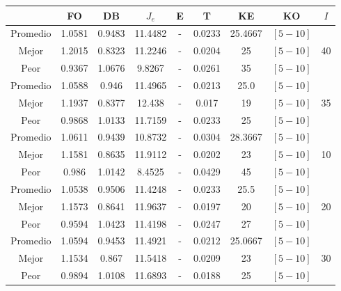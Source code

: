 \begin{table}[h!]
    \footnotesize
    \begin{center}
        \begin{tabular}{|c|c|c|c|c|c|c|c|c|}
        \hline
            & {\bf FO} & {\bf DB} & $J_e$ & {\bf E} & {\bf T} & {\bf KE} & {\bf KO} & $I$\\
        \hline
        \hline
            Promedio  & 1.0581 & 0.9483 & 11.4482 & - & 0.0233 & 25.4667 & $[5-10]$ & \\
            \cline{1-8}
            Mejor & 1.2015 & 0.8323  & 11.2246 & - & 0.0204 & 25 & $[5-10]$ & 40\\
            \cline{1-8}
            Peor & 0.9367 & 1.0676  & 9.8267 & - & 0.0261 & 35 & $[5-10]$ & \\
        \hline
        \hline
            Promedio  & 1.0588 & 0.946 & 11.4965 & - & 0.0213 & 25.0 & $[5-10]$ & \\
            \cline{1-8}
            Mejor & 1.1937 & 0.8377  & 12.438 & - & 0.017 & 19 & $[5-10]$ & 35\\
            \cline{1-8}
            Peor & 0.9868 & 1.0133  & 11.7159 & - & 0.0233 & 25 & $[5-10]$ & \\
        \hline
        \hline
            Promedio  & 1.0611 & 0.9439 & 10.8732 & - & 0.0304 & 28.3667 & $[5-10]$ & \\
            \cline{1-8}
            Mejor & 1.1581 & 0.8635  & 11.9112 & - & 0.0202 & 23 & $[5-10]$ & 10\\
            \cline{1-8}
            Peor & 0.986 & 1.0142  & 8.4525 & - & 0.0429 & 45 & $[5-10]$ & \\
        \hline
        \hline
            Promedio  & 1.0538 & 0.9506 & 11.4248 & - & 0.0233 & 25.5 & $[5-10]$ & \\
            \cline{1-8}
            Mejor & 1.1573 & 0.8641  & 11.9637 & - & 0.0197 & 20 & $[5-10]$ & 20\\
            \cline{1-8}
            Peor & 0.9594 & 1.0423  & 11.4198 & - & 0.0247 & 27 & $[5-10]$ & \\
        \hline
        \hline
            Promedio  & 1.0594 & 0.9453 & 11.4921 & - & 0.0212 & 25.0667 & $[5-10]$ & \\
            \cline{1-8}
            Mejor & 1.1534 & 0.867  & 11.5418 & - & 0.0209 & 23 & $[5-10]$ & 30\\
            \cline{1-8}
            Peor & 0.9894 & 1.0108  & 11.6893 & - & 0.0188 & 25 & $[5-10]$ & \\

\end{tabular}
\end{center}
\end{table}
